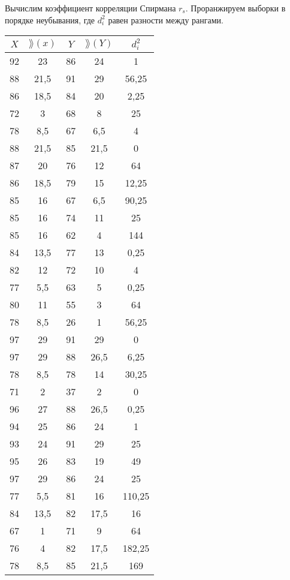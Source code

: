 \documentclass[utf8, a4paper, 14pt, russian, oneside]{book}
\begin{document}
Вычислим коэффициент корреляции Спирмана $r_s$. Проранжируем выборки в порядке неубывания, где $d^2_i$ равен разности между рангами.
\begin{table}[h!]
    \centering
    \begin{tabular}{|c|c|c|c|c|}
        \hline 
        $X$ & $\rang(x)$ & $Y$ & $\rang(Y)$ & $d_i^2$ \\ \hline
        92 &   23 & 86 &   24 &      1 \\ \hline   
        88 & 21,5 & 91 &   29 &  56,25 \\ \hline   
        86 & 18,5 & 84 &   20 &   2,25 \\ \hline   
        72 &    3 & 68 &    8 &     25 \\ \hline   
        78 &  8,5 & 67 &  6,5 &      4 \\ \hline   
        88 & 21,5 & 85 & 21,5 &      0 \\ \hline   
        87 &   20 & 76 &   12 &     64 \\ \hline   
        86 & 18,5 & 79 &   15 &  12,25 \\ \hline   
        85 &   16 & 67 &  6,5 &  90,25 \\ \hline   
        85 &   16 & 74 &   11 &     25 \\ \hline   
        85 &   16 & 62 &    4 &    144 \\ \hline   
        84 & 13,5 & 77 &   13 &   0,25 \\ \hline   
        82 &   12 & 72 &   10 &      4 \\ \hline   
        77 &  5,5 & 63 &    5 &   0,25 \\ \hline   
        80 &   11 & 55 &    3 &     64 \\ \hline   
        78 &  8,5 & 26 &    1 &  56,25 \\ \hline   
        97 &   29 & 91 &   29 &      0 \\ \hline   
        97 &   29 & 88 & 26,5 &   6,25 \\ \hline   
        78 &  8,5 & 78 &   14 &  30,25 \\ \hline   
        71 &    2 & 37 &    2 &      0 \\ \hline   
        96 &   27 & 88 & 26,5 &   0,25 \\ \hline   
        94 &   25 & 86 &   24 &      1 \\ \hline   
        93 &   24 & 91 &   29 &     25 \\ \hline   
        95 &   26 & 83 &   19 &     49 \\ \hline   
        97 &   29 & 86 &   24 &     25 \\ \hline   
        77 &  5,5 & 81 &   16 & 110,25 \\ \hline   
        84 & 13,5 & 82 & 17,5 &     16 \\ \hline   
        67 &    1 & 71 &    9 &     64 \\ \hline   
        76 &    4 & 82 & 17,5 & 182,25 \\ \hline   
        78 &  8,5 & 85 & 21,5 &    169 \\ \hline   
    \end{tabular} 
\end{table}
\end{document}
